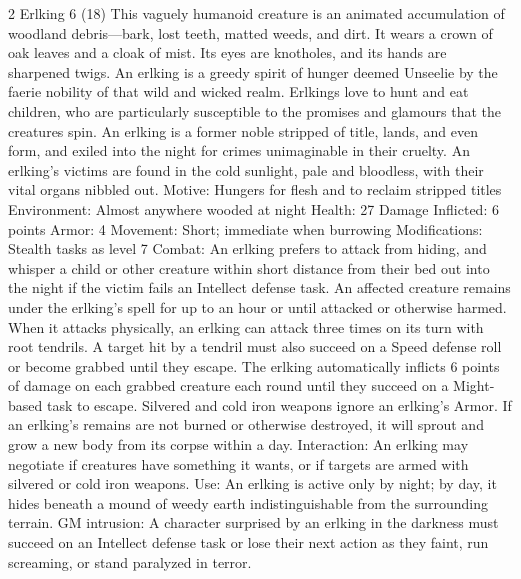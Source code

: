 \begin{multicols}{2}
Erlking 6 (18)
This vaguely humanoid creature is an animated accumulation of woodland debris—bark, lost teeth, matted weeds, and dirt. It wears a crown of oak leaves and a cloak of mist.
Its eyes are knotholes, and its hands are sharpened twigs. An erlking is a greedy spirit of hunger deemed Unseelie by the faerie nobility of that wild and wicked realm. Erlkings love to hunt and eat children, who are particularly susceptible to the promises and glamours that the creatures spin.
	An erlking is a former noble stripped of title, lands, and even form,
and exiled into the night for crimes unimaginable in their cruelty. An erlking’s victims are found in the cold sunlight, pale and bloodless, with their vital organs nibbled out.
Motive: Hungers for flesh and to reclaim stripped titles 
Environment: Almost anywhere wooded at night Health: 27
Damage Inflicted: 6 points
Armor: 4
Movement: Short; immediate when burrowing
Modifications: Stealth tasks as level 7
Combat: An erlking prefers to attack from hiding, and whisper a child or other creature
within short distance from their bed out into the night if the victim fails an Intellect defense task. An affected creature remains under the erlking’s spell for up to an hour or until attacked or otherwise harmed.
When it attacks physically, an erlking can attack three times on its turn with root tendrils. A target hit by a tendril must also succeed on a Speed defense roll or become grabbed until they escape. The erlking automatically inflicts 6 points of damage on each grabbed creature each round until they succeed on a Might-based task to escape.
Silvered and cold iron weapons ignore an erlking’s Armor. If an erlking’s remains are not burned or otherwise destroyed, it will sprout and grow a new body from its corpse within a day.
Interaction: An erlking may negotiate if creatures have something it wants, or if targets are armed with silvered or cold iron weapons.
Use: An erlking is active only by night; by day, it hides beneath a mound of weedy earth indistinguishable from the surrounding terrain.
GM intrusion: A character surprised by an erlking in the darkness must succeed on an Intellect defense task or lose their next action as they faint, run screaming, or stand paralyzed in terror.


\end{multicols}
